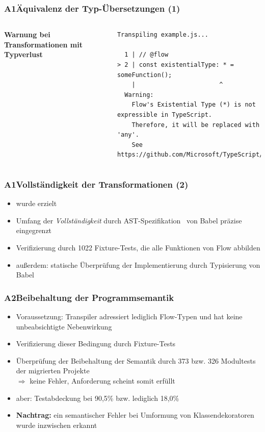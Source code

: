       \begin{frame}[fragile]
        \frametitle{A1\hspace{0.75em}Äquivalenz der Typ-Übersetzungen (1)}
        \begin{columns}
          \column{\dimexpr\paperwidth-16mm}
          \textbf{Warnung bei Transformationen mit Typverlust}
          \vspace{1.5em}
          \begin{lstlisting}[emph={Warning},numbers=none]
Transpiling example.js...

  1 | // @flow
> 2 | const existentialType: * = someFunction();
    |                       ^
  Warning:
    Flow's Existential Type (*) is not expressible in TypeScript.
    Therefore, it will be replaced with 'any'.
    See https://github.com/Microsoft/TypeScript/issues/14466.
            \end{lstlisting}
        \end{columns}

      \end{frame}

      \begin{frame}
        \frametitle{A1\hspace{0.75em}Vollständigkeit der Transformationen (2)}
        \begin{itemize}
          \item wurde erzielt
          \item Umfang der \textit{Vollständigkeit} durch AST-Spezifikation~\autocite{BABEL:PARSER_SPEC} von Babel präzise eingegrenzt
          \item Verifizierung durch 1022 Fixture-Tests, die alle Funktionen von Flow abbilden
          \item außerdem: statische Überprüfung der Implementierung durch Typisierung von Babel
        \end{itemize}
      \end{frame}

      \begin{frame}
        \frametitle{A2\hspace{0.75em}Beibehaltung der Programmsemantik}
          \begin{itemize}
            \item Voraussetzung: Transpiler adressiert lediglich Flow-Typen und hat keine unbeabsichtigte Nebenwirkung
            \item Verifizierung dieser Bedingung durch Fixture-Tests
            \item Überprüfung der Beibehaltung der Semantik durch 373 bzw. 326 Modultests der migrierten Projekte\\
              \smallskip
              $\Rightarrow$ keine Fehler, Anforderung scheint somit erfüllt
            \item aber: Testabdeckung bei 90,5\% bzw. lediglich 18,0\%
            \item \textbf{Nachtrag:} ein semantischer Fehler bei Umformung von Klassendekoratoren wurde inzwischen erkannt
          \end{itemize}
      \end{frame}

